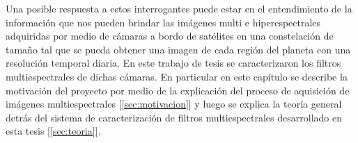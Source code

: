 \begin{figure}[H]
	\begin{floatrow}
	\end{floatrow}
\end{figure}

Una posible respuesta a estos interrogantes puede estar en el entendimiento de la información que nos pueden brindar las imágenes multi e hiperespectrales adquiridas por medio de cámaras a bordo de satélites en una constelación de tamaño tal que se pueda obtener una imagen de cada región del planeta con una resolución temporal diaria. En este trabajo de tesis se caracterizaron los filtros multiespectrales de dichas cámaras. En particular en este capítulo se describe la motivación del proyecto por medio de la explicación del proceso de aquisición de imágenes multiespectrales [\ref{sec:motivacion}] y luego se explica la teoría general detrás del sistema de caracterización de filtros multiespectrales desarrollado en esta tesis [\ref{sec:teoria}].

